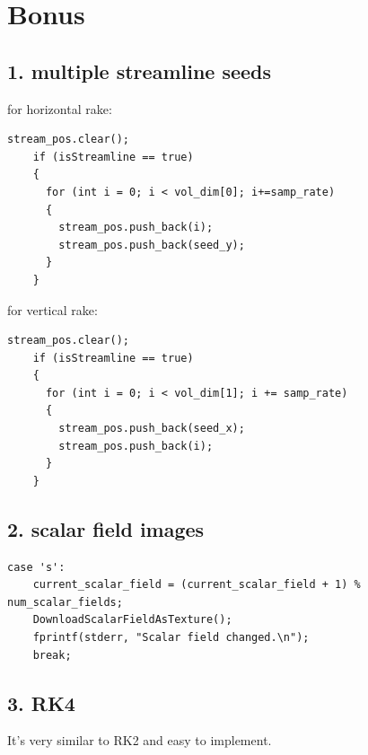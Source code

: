 \documentclass[12pt,letterpaper,fleqn]{article}          %
\begin{document}
\section{Bonus}

\subsection*{1. multiple streamline seeds}
for horizontal rake:
\begin{lstlisting}
stream_pos.clear();
    if (isStreamline == true)
    {
      for (int i = 0; i < vol_dim[0]; i+=samp_rate)
      {
        stream_pos.push_back(i);
        stream_pos.push_back(seed_y);
      }
    }
\end{lstlisting}

for vertical rake:
\begin{lstlisting}
stream_pos.clear();
    if (isStreamline == true)
    {
      for (int i = 0; i < vol_dim[1]; i += samp_rate)
      {
        stream_pos.push_back(seed_x);
        stream_pos.push_back(i);
      }
    }
\end{lstlisting}

\subsection*{2. scalar field images}

\begin{lstlisting}
case 's':
    current_scalar_field = (current_scalar_field + 1) % num_scalar_fields;
    DownloadScalarFieldAsTexture();
    fprintf(stderr, "Scalar field changed.\n");
    break;
\end{lstlisting}

\subsection*{3. RK4}
It's very similar to RK2 and easy to implement.

%




\end{document}
